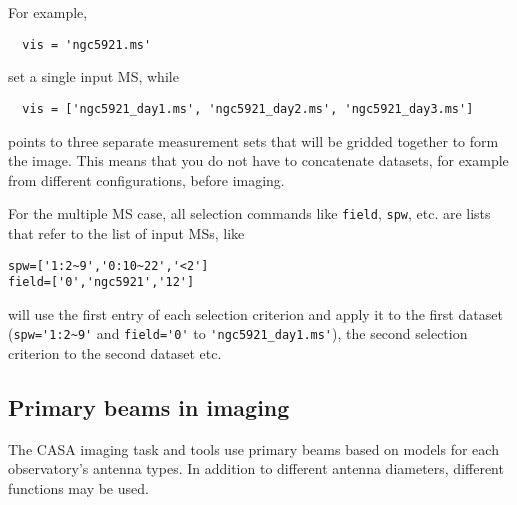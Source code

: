 For example,
\small
\begin{verbatim}
  vis = 'ngc5921.ms'
\end{verbatim}
\normalsize
set a single input MS, while
\small
\begin{verbatim}
  vis = ['ngc5921_day1.ms', 'ngc5921_day2.ms', 'ngc5921_day3.ms']
\end{verbatim}
\normalsize points to three separate measurement sets that will be
gridded together to form the image.  This means that you do not have
to concatenate datasets, for example from different configurations,
before imaging. 

For the multiple MS case, all selection commands like {\tt field},
{\tt spw}, etc. are lists that refer to the list of input MSs,
like 

\small
\begin{verbatim}
spw=['1:2~9','0:10~22','<2']
field=['0','ngc5921','12']
\end{verbatim}
\normalsize

will use the first entry of each selection criterion and apply it to
the first dataset (\verb+spw='1:2~9'+ and \verb+field='0'+ to
\verb+'ngc5921_day1.ms'+), the second selection criterion to the
second dataset etc.

\subsection{Primary beams in imaging }
\label{section:im.pars.pb}

The CASA imaging task and tools use primary beams based on models
for each observatory's antenna types.  In addition to different 
antenna diameters, different functions may be used.  

